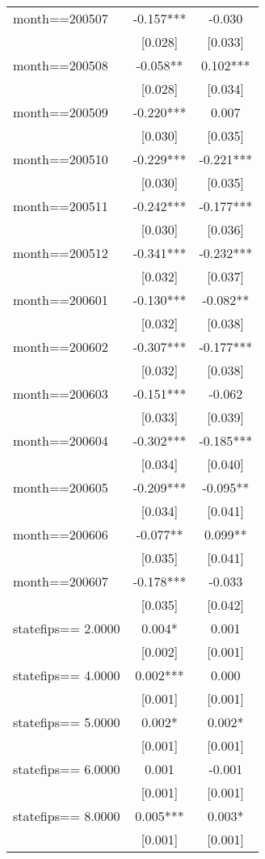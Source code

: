 \documentclass[]{article}
\begin{document}
\begin{tabular}{lcc}
month==200507 & -0.157*** & -0.030 \\
 & [0.028] & [0.033] \\
month==200508 & -0.058** & 0.102*** \\
 & [0.028] & [0.034] \\
month==200509 & -0.220*** & 0.007 \\
 & [0.030] & [0.035] \\
month==200510 & -0.229*** & -0.221*** \\
 & [0.030] & [0.035] \\
month==200511 & -0.242*** & -0.177*** \\
 & [0.030] & [0.036] \\
month==200512 & -0.341*** & -0.232*** \\
 & [0.032] & [0.037] \\
month==200601 & -0.130*** & -0.082** \\
 & [0.032] & [0.038] \\
month==200602 & -0.307*** & -0.177*** \\
 & [0.032] & [0.038] \\
month==200603 & -0.151*** & -0.062 \\
 & [0.033] & [0.039] \\
month==200604 & -0.302*** & -0.185*** \\
 & [0.034] & [0.040] \\
month==200605 & -0.209*** & -0.095** \\
 & [0.034] & [0.041] \\
month==200606 & -0.077** & 0.099** \\
 & [0.035] & [0.041] \\
month==200607 & -0.178*** & -0.033 \\
 & [0.035] & [0.042] \\
statefips==     2.0000 & 0.004* & 0.001 \\
 & [0.002] & [0.001] \\
statefips==     4.0000 & 0.002*** & 0.000 \\
 & [0.001] & [0.001] \\
statefips==     5.0000 & 0.002* & 0.002* \\
 & [0.001] & [0.001] \\
statefips==     6.0000 & 0.001 & -0.001 \\
 & [0.001] & [0.001] \\
statefips==     8.0000 & 0.005*** & 0.003* \\
 & [0.001] & [0.001] \\

\end{tabular}
\end{document}
